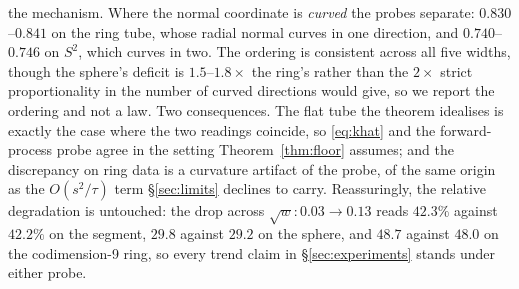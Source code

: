 \documentclass[11pt]{article}
\theoremstyle{remark}
\begin{document}
the mechanism. Where the normal coordinate is \emph{curved} the probes separate:
$0.830$--$0.841$ on the ring tube, whose radial normal curves in one direction, and
$0.740$--$0.746$ on $S^2$, which curves in two. The ordering is consistent across all five widths, though
the sphere's deficit is $1.5$--$1.8\times$ the ring's rather than the $2\times$ strict
proportionality in the number of curved directions would give, so we report the ordering
and not a law. Two consequences. The flat tube the theorem idealises is exactly the case
where the two readings coincide, so \eqref{eq:khat} and the forward-process probe agree in
the setting Theorem~\ref{thm:floor} assumes; and the discrepancy on ring data is a
curvature artifact of the probe, of the same origin as the $O(s^2/\tau)$ term
\S\ref{sec:limits} declines to carry. Reassuringly, the relative degradation is untouched:
the drop across $\sqrt w\!:0.03\to0.13$ reads $42.3\%$ against $42.2\%$ on the segment,
$29.8$ against $29.2$ on the sphere, and $48.7$ against $48.0$ on the codimension-9 ring,
so every trend claim in \S\ref{sec:experiments} stands under either probe.
\end{document}

